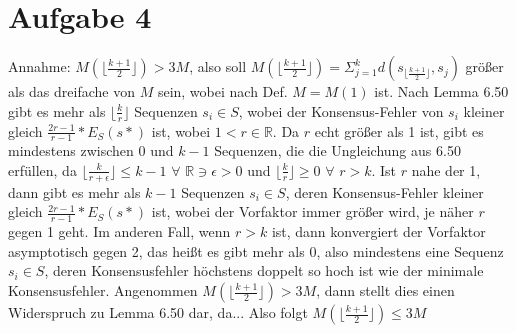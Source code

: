 \documentclass[a4paper,10pt,oneside,reqno]{scrartcl}
\begin{document}
\section*{Aufgabe 4}%
Annahme: $M(\lfloor \frac{k+1}{2}\rfloor) > 3M$, also soll 
$M(\lfloor \frac{k+1}{2}\rfloor) = \Sigma_{j=1}^k d(s_{\lfloor \frac{k+1}{2}\rfloor}, s_j)$ größer als
das dreifache von $M$ sein, wobei nach Def. $M = M(1)$ ist.
Nach Lemma 6.50 gibt es mehr als $\lfloor \frac{k}{r}\rfloor$ Sequenzen $s_i \in S$, wobei der Konsensus-Fehler von $s_i$ kleiner gleich
$\frac{2r-1}{r-1}*E_S(s*)$ ist, wobei $1<r \in \mathbb{R}$. Da $r$ echt größer als 1 ist, gibt es mindestens zwischen 0 und $k-1$ Sequenzen,
die die Ungleichung aus 6.50 erfüllen, da $\lfloor \frac{k}{r+\epsilon}\rfloor \leq k-1$  $\forall$  $\mathbb{R} \ni \epsilon > 0$ und
$\lfloor \frac{k}{r}\rfloor \geq 0$ $\forall$ $r>k$.\newline
Ist $r$ nahe der 1, dann gibt es mehr als $k-1$ Sequenzen $s_i \in S$, deren Konsensus-Fehler kleiner gleich $\frac{2r-1}{r-1}*E_S(s*)$ ist,
wobei der Vorfaktor immer größer wird, je näher $r$ gegen 1 geht. Im anderen Fall, wenn $r>k$ ist, dann konvergiert der Vorfaktor
asymptotisch gegen 2, das heißt es gibt mehr als 0, also mindestens eine Sequenz $s_i \in S$, deren Konsensusfehler höchstens doppelt so hoch
ist wie der minimale Konsensusfehler.\newline
Angenommen $M(\lfloor \frac{k+1}{2}\rfloor) > 3M$, dann stellt dies einen Widerspruch zu Lemma 6.50 dar, da...\newline
Also folgt $M(\lfloor \frac{k+1}{2}\rfloor) \leq 3M$
 
\end{document}
